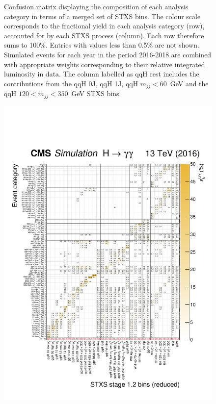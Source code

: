 \begin{figure}
  {
    Confusion matrix displaying the composition of each analysis category in terms of a merged set of STXS bins. The colour scale corresponds to the fractional yield in each analysis category (row), accounted for by each STXS process (column). Each row therefore sums to 100\%. Entries with values less than 0.5\% are not shown. Simulated events for each year in the period 2016-2018 are combined with appropriate weights corresponding to their relative integrated luminosity in data. The column labelled as qqH rest includes the contributions from the qqH 0J, qqH 1J, qqH $m_{jj}<60$~GeV and the qqH $120<m_{jj}<350$~GeV STXS bins.
  }
  \label{fig:purity_matrix_full}
\end{figure}

\begin{figure}
  \centering
  \includegraphics[width=1\textwidth]{Figures/app_matrices/migrationMatrix_2016_thesis.pdf}

\end{figure}
